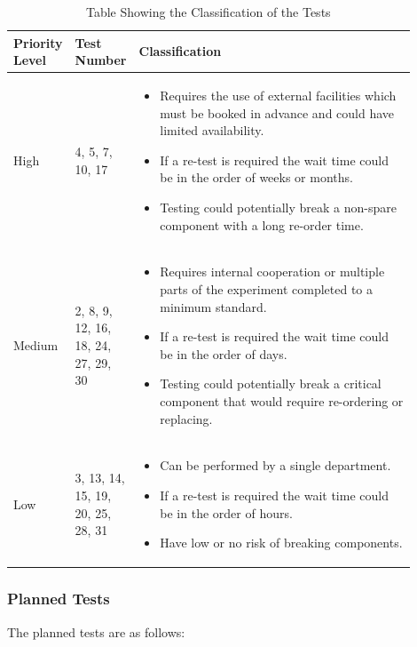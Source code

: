 \documentclass[a4paper,12pt,twoside]{article}
\providecommand{\DIFaddtex}[1]{{\protect\color{blue}\uwave{#1}}} %
\providecommand{\DIFaddFL}[1]{\DIFadd{#1}} %
\providecommand{\DIFaddbeginFL}{} %
\providecommand{\DIFaddendFL}{} %
\providecommand{\DIFadd}[1]{\texorpdfstring{\DIFaddtex{#1}}{#1}} %
\newcommand{\DIFaddincludegraphics}[2][]{{\color{blue}\fbox{\DIFOincludegraphics[#1]{#2}}}} %
\DeclareRobustCommand{\DIFaddbeginFL}{\DIFOaddbeginFL \let\includegraphics\DIFaddincludegraphics} %
\DeclareRobustCommand{\DIFaddendFL}{\DIFOaddendFL \let\includegraphics\DIFOincludegraphics} %
\begin{document}
\begin{table}[H]
\centering
\begin{tabular}{|p{0.1\linewidth}|p{0.1\linewidth}|p{0.7\linewidth}|}
\hline
\textbf{Priority Level} & \textbf{Test Number} & \textbf{Classification} \\ \hline
High & 4, 5, 7, 10, 17 & \begin{itemize}
    \item Requires the use of external facilities which must be booked in advance and could have limited availability.
    \item If a re-test is required the wait time could be in the order of weeks or months.
    \item Testing could potentially break a non-spare component with a long re-order time.
\end{itemize}\\ \hline
Medium & 2, 8, 9, 12, 16, 18, 24, 27, 29, 30 & \begin{itemize}
    \item Requires internal cooperation or multiple parts of the experiment completed to a minimum standard.
    \item If a re-test is required the wait time could be in the order of days.
    \item Testing could potentially break a critical component that would require re-ordering or replacing.
\end{itemize} \\ \hline
Low & 3, 13, 14, 15, 19, 20, 25, 28, 31 & \begin{itemize}
    \item Can be performed by a single department.
    \item If a re-test is required the wait time could be in the order of hours.
    \item Have low or no risk of breaking components.
\end{itemize} \\ \hline
\end{tabular}
\caption{Table Showing the Classification of the Tests\DIFaddbeginFL \DIFaddFL{.}\DIFaddendFL }
\label{tab:classification}
\end{table}

\raggedbottom

\subsubsection{Planned Tests}
The planned tests are as follows:
\end{document}
